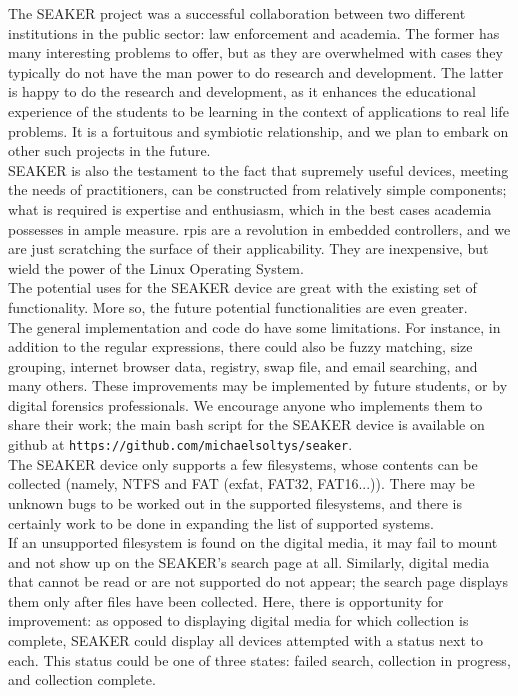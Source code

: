 \documentclass[12pt]{article}
\begin{document}
The SEAKER project was a successful collaboration between two different institutions in the public
sector: law enforcement and academia. The former has many interesting problems to offer, but as they
are overwhelmed with cases they typically do not have the man power to do research and development.
The latter is happy to do the research and development, as it enhances the educational experience of the students to be learning
in the context of applications to real life problems. It is a fortuitous and symbiotic relationship, and we
plan to embark on other such projects in the future.\\

SEAKER is also the testament to the fact that supremely useful devices, meeting the needs of
practitioners, can be constructed from relatively simple components; what is required is expertise and
enthusiasm, which in the best cases academia possesses in ample measure. \glspl{rpi} are a revolution in
embedded controllers, and we are just scratching the surface of their applicability. They are inexpensive,
but wield the power of the Linux Operating System.\\

The potential uses for the SEAKER device are great with the existing set of
functionality.  More so, the future potential functionalities are even greater.\\

The general implementation and code do have some limitations.  For instance,
in addition to the regular expressions, there could also be fuzzy matching, size
grouping, internet browser data, registry, swap file, and email searching, and
many others.  These improvements may be implemented by future students, or by digital
forensics professionals. We encourage anyone who implements them to share their work; the main bash
script for the SEAKER device is available on github at {\tt https://github.com/michaelsoltys/seaker}.\\

The SEAKER device only supports a few filesystems, whose contents can be collected
(namely, NTFS and FAT (exfat, FAT32, FAT16...)). There may be unknown bugs to be worked out
in the supported filesystems, and there is certainly work to be done in expanding the
list of supported systems.\\

If an unsupported filesystem is found on the digital media, it may fail to
mount and not show up on the SEAKER's search page at all. Similarly, digital
media that cannot be read or are not supported do not appear; the search page
displays them only after files have been collected. Here, there is opportunity
for improvement: as opposed to displaying digital media for which collection is
complete, SEAKER could display all devices attempted with a status next to each. This
status could be one of three states: failed search,
collection in progress, and collection complete.\\
\end{document}
